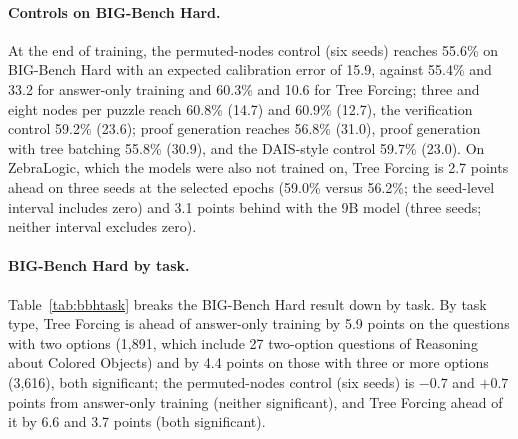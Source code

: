 \documentclass[10pt]{article}
\newcommand{\tf}{Tree Forcing}
\begin{document}
\paragraph{Controls on BIG-Bench Hard.} At the end of training, the permuted-nodes control (six seeds) reaches
55.6\% on BIG-Bench Hard with an expected calibration error of 15.9, against 55.4\% and 33.2 for answer-only training
and 60.3\% and 10.6 for \tf{}; three and eight nodes per puzzle reach 60.8\% (14.7) and 60.9\% (12.7), the
verification control 59.2\% (23.6); proof generation reaches 56.8\% (31.0), proof generation with tree
batching 55.8\% (30.9), and the DAIS-style control 59.7\% (23.0). On ZebraLogic, which the models were also not
trained on, \tf{} is 2.7 points ahead on three seeds at the selected epochs (59.0\% versus 56.2\%; the seed-level
interval includes zero) and 3.1 points behind with the 9B model (three seeds; neither interval excludes zero).

\paragraph{BIG-Bench Hard by task.} Table~\ref{tab:bbhtask} breaks the BIG-Bench Hard result down by task. By task type,
\tf{} is ahead of answer-only training by 5.9 points on the questions with two options (1,891, which include 27
two-option questions of Reasoning about Colored Objects) and by 4.4 points on those with three or more options (3,616),
both significant; the permuted-nodes control (six seeds) is $-0.7$ and
$+0.7$ points from answer-only training (neither significant), and \tf{} ahead of it by 6.6 and 3.7 points (both
significant).
\end{document}
